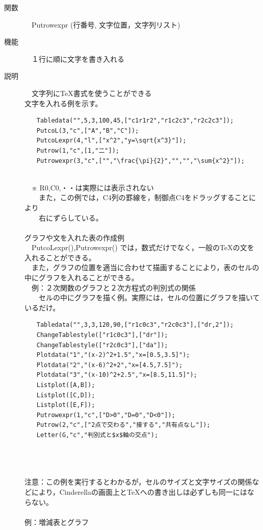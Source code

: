 \documentclass[papersize,a4paper,12pt,uplatex]{jsarticle}
\begin{document}
\begin{description}
\hypertarget{putrowexpr}{}
\item[関数]　Putrowexpr (行番号, 文字位置，文字列リスト)
\item[機能]　１行に順に文字を書き入れる
\item[説明]　文字列に\TeX 書式を使うことができる\\

文字を入れる例を示す。
\begin{verbatim}
　　Tabledata("",5,3,100,45,["c1r1r2","r1c2c3","r2c2c3"]);
　　PutcoL(3,"c",["A","B","C"]);
　　PutcoLexpr(4,"l",["x^2","y=\sqrt{x^3}"]);
　　Putrow(1,"c",[1,"二"]);
　　Putrowexpr(3,"c",["","\frac{\pi}{2}","","","\sum{x^2}"]);
\end{verbatim}

　　　　　\\

　※ R0,C0,・・は実際には表示されない\\
　　また，この例では，C4列の罫線を，制御点C4をドラッグすることにより\\
　　右にずらしている。\\
\\

グラフや文を入れた表の作成例\\

　PutcoLexpr(),Putrowexpr() では，数式だけでなく，一般の\TeX の文を入れることができる。\\
　また，グラフの位置を適当に合わせて描画することにより，表のセルの中にグラフを入れることができる。\\

　例：２次関数のグラフと２次方程式の判別式の関係\\
　　セルの中にグラフを描く例。実際には，セルの位置にグラフを描いているだけ。
\begin{verbatim}
　　Tabledata("",3,3,120,90,["r1c0c3","r2c0c3"],["dr,2"]);
　　ChangeTablestyle(["r1c0c3"],["dr"]);
　　ChangeTablestyle(["r2c0c3"],["da"]);
　　Plotdata("1","(x-2)^2+1.5","x=[0.5,3.5]");
　　Plotdata("2","(x-6)^2+2","x=[4.5,7.5]");
　　Plotdata("3","(x-10)^2+2.5","x=[8.5,11.5]");
　　Listplot([A,B]);
　　Listplot([C,D]);
　　Listplot([E,F]);
　　Putrowexpr(1,"c",["D>0","D=0","D<0"]);
　　Putrow(2,"c",["2点で交わる","接する","共有点なし"]);
　　Letter(G,"c","判別式と$x$軸の交点");
\end{verbatim}
　\\
　　　　　　　\\
\\
注意：この例を実行するとわかるが，セルのサイズと文字サイズの関係などにより，Cinderellaの画面上と\TeX への書き出しは必ずしも同一にはならない。\\
　\\
例：増減表とグラフ\\


\end{description}
\end{document}
